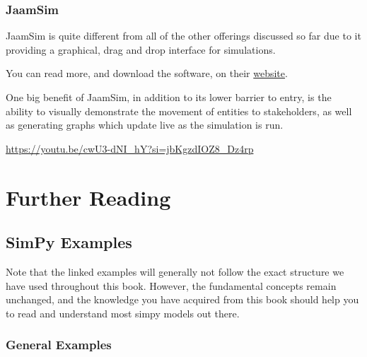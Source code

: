 \documentclass[
  letterpaper,
  DIV=11,
  numbers=noendperiod]{scrreprt}
\begin{document}
\subsection{JaamSim}\label{jaamsim}

JaamSim is quite different from all of the other offerings discussed so
far due to it providing a graphical, drag and drop interface for
simulations.

You can read more, and download the software, on their
\href{https://jaamsim.com/}{website}.

One big benefit of JaamSim, in addition to its lower barrier to entry,
is the ability to visually demonstrate the movement of entities to
stakeholders, as well as generating graphs which update live as the
simulation is run.

\url{https://youtu.be/cwU3-dNI_hY?si=jbKgzdIOZ8_Dz4rp}


\chapter{Further Reading}\label{further-reading}

\section{SimPy Examples}\label{simpy-examples}

\begin{tcolorbox}[enhanced jigsaw, colframe=quarto-callout-warning-color-frame, bottomtitle=1mm, breakable, rightrule=.15mm, coltitle=black, colbacktitle=quarto-callout-warning-color!10!white, opacityback=0, leftrule=.75mm, arc=.35mm, toptitle=1mm, title=\textcolor{quarto-callout-warning-color}{\faExclamationTriangle}\hspace{0.5em}{Warning}, titlerule=0mm, colback=white, toprule=.15mm, bottomrule=.15mm, left=2mm, opacitybacktitle=0.6]

Note that the linked examples will generally not follow the exact
structure we have used throughout this book. However, the fundamental
concepts remain unchanged, and the knowledge you have acquired from this
book should help you to read and understand most simpy models out there.

\end{tcolorbox}

\subsection{General Examples}\label{general-examples}
\end{document}
